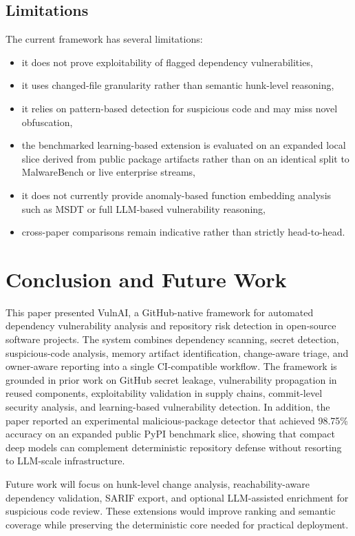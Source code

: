 \documentclass[conference]{IEEEtran}
\begin{document}
\subsection{Limitations}
The current framework has several limitations:
\begin{itemize}
\item it does not prove exploitability of flagged dependency vulnerabilities,
\item it uses changed-file granularity rather than semantic hunk-level reasoning,
\item it relies on pattern-based detection for suspicious code and may miss novel obfuscation,
\item the benchmarked learning-based extension is evaluated on an expanded local slice derived from public package artifacts rather than on an identical split to MalwareBench or live enterprise streams,
\item it does not currently provide anomaly-based function embedding analysis such as MSDT or full LLM-based vulnerability reasoning,
\item cross-paper comparisons remain indicative rather than strictly head-to-head.
\end{itemize}

\section{Conclusion and Future Work}
This paper presented VulnAI, a GitHub-native framework for automated dependency vulnerability analysis and repository risk detection in open-source software projects. The system combines dependency scanning, secret detection, suspicious-code analysis, memory artifact identification, change-aware triage, and owner-aware reporting into a single CI-compatible workflow. The framework is grounded in prior work on GitHub secret leakage, vulnerability propagation in reused components, exploitability validation in supply chains, commit-level security analysis, and learning-based vulnerability detection. In addition, the paper reported an experimental malicious-package detector that achieved 98.75\% accuracy on an expanded public PyPI benchmark slice, showing that compact deep models can complement deterministic repository defense without resorting to LLM-scale infrastructure.

Future work will focus on hunk-level change analysis, reachability-aware dependency validation, SARIF export, and optional LLM-assisted enrichment for suspicious code review. These extensions would improve ranking and semantic coverage while preserving the deterministic core needed for practical deployment.



\end{document}
